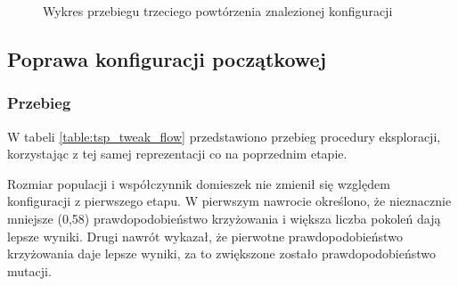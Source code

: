 \documentclass[./FM_mgr.tex]{subfiles}
\begin{document}
\begin{figure}[H]
	\caption{Wykres przebiegu trzeciego powtórzenia znalezionej konfiguracji \label{figure:tsp_init_example}}
	\centering
\end{figure}

\subsection{Poprawa konfiguracji początkowej}

\subsubsection{Przebieg}

W tabeli \ref{table:tsp_tweak_flow} przedstawiono przebieg procedury eksploracji, korzystając z tej samej reprezentacji co na poprzednim etapie.

Rozmiar populacji i współczynnik domieszek nie zmienił się względem konfiguracji z pierwszego etapu.
W pierwszym nawrocie określono, że nieznacznie mniejsze (0,58) prawdopodobieństwo krzyżowania i większa liczba pokoleń dają lepsze wyniki.
Drugi nawrót wykazał, że pierwotne prawdopodobieństwo krzyżowania daje lepsze wyniki, za to zwiększone zostało prawdopodobieństwo mutacji. 
\end{document}
